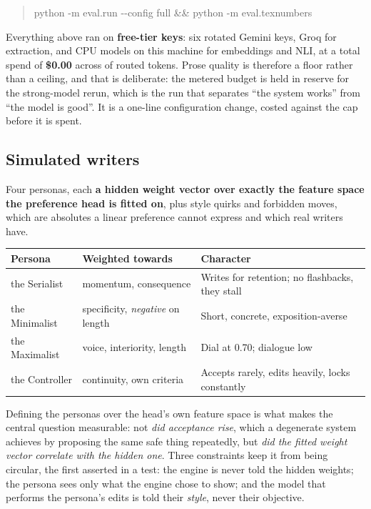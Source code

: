 \documentclass{article}
\begin{document}
\begin{quote}\ttfamily\small
python -m eval.run -{}-config full \&\& python -m eval.texnumbers
\end{quote}

Everything above ran on \textbf{free-tier keys}: six rotated Gemini keys, Groq for
extraction, and CPU models on this machine for embeddings and NLI, at a total spend of
\textbf{\$0.00} across \rProviderTokens{} of routed tokens. Prose quality is therefore a floor rather than
a ceiling,
and that is deliberate: the metered budget is held in reserve for the strong-model rerun,
which is the run that separates ``the system works'' from ``the model is good''. It is a
one-line configuration change, costed against the cap before it is spent.



\subsection{Simulated writers}

Four personas, each \textbf{a hidden weight vector over exactly the feature space the
preference head is fitted on}, plus style quirks and forbidden moves, which are
absolutes a linear preference cannot express and which real writers have.

\begin{center}
\begin{tabular}{@{}llp{}@{}}
\toprule
\textbf{Persona} & \textbf{Weighted towards} & \textbf{Character} \\
\midrule
the Serialist & momentum, consequence & Writes for retention; no flashbacks, they stall \\
the Minimalist & specificity, \emph{negative} on length & Short, concrete, exposition-averse \\
the Maximalist & voice, interiority, length & Dial at 0.70; dialogue low \\
the Controller & continuity, own criteria & Accepts rarely, edits heavily, locks constantly \\
\bottomrule
\end{tabular}
\end{center}

Defining the personas over the head's own feature space is what makes the central question
measurable: not \emph{did acceptance rise}, which a degenerate system
achieves by proposing the same safe thing repeatedly, but \emph{did the fitted weight
vector correlate with the hidden one}. Three constraints keep it from being circular, the first
asserted in a test: the engine is never told the hidden weights; the persona sees only what
the engine chose to show; and the model that performs the persona's edits is told their
\emph{style}, never their objective.
\end{document}
